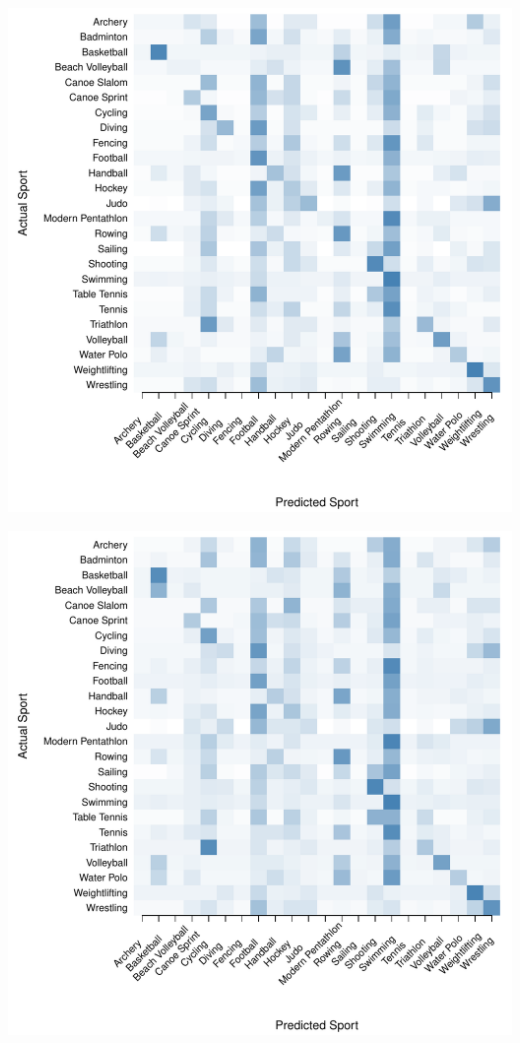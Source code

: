 \documentclass[landscape, paperwidth=42in, paperheight=36in,
fontscale=.35, margin=1in]{baposter}
\begin{document}
\begin{poster}
{\begin{center}
  \begin{minipage}{0.45\textwidth}
    \begin{center}
      \includegraphics[scale=0.27]{../graphics/sportANN-trn.pdf}
    \end{center}
  \end{minipage}
  \hspace{0.05\textwidth}
  \begin{minipage}{0.45\textwidth}
    \begin{center}
      \includegraphics[scale=0.27]{../graphics/sportANN-tst.pdf}

\end{center}
\end{minipage}
\end{center}}
\end{poster}
\end{document}
